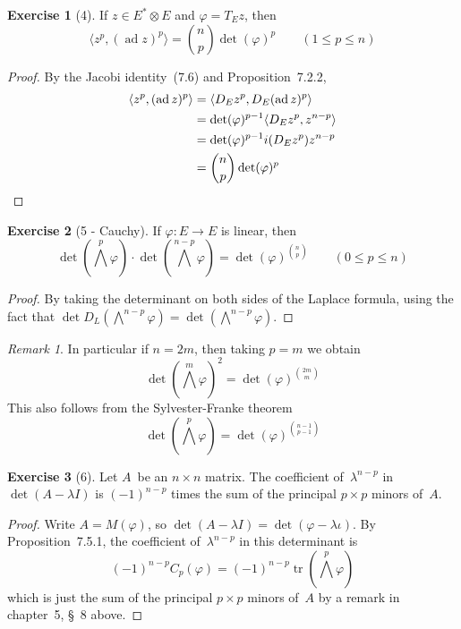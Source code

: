 \documentclass[letterpaper,12pt]{article}
\DeclareMathOperator{\ad}{ad}
\DeclareMathOperator{\tr}{tr}
\newcommand{\mult}{\cdot}
\newcommand{\tprod}{\otimes}
\newcommand{\bigeprod}{\bigwedge}
\newcommand{\medeprod}{{\textstyle\bigeprod}}
\newcommand{\sprod}[2]{\langle#1,#2\rangle}
\theoremstyle{definition}
\newtheorem*{exer}{Exercise}
\theoremstyle{remark}
\newtheorem*{rmk}{Remark}
\begin{document}
\begin{exer}[4]
If \(z\in E^*\tprod E\) and \(\varphi=T_Ez\), then
\[\sprod{z^p}{(\ad z)^p}=\binom{n}{p}\det(\varphi)^p\qquad(1\le p\le n)\]
\end{exer}
\begin{proof}
By the Jacobi identity~(7.6) and Proposition~7.2.2,
\begin{align*}
\sprod{z^p}{(\ad z)^p}&=\sprod{D_Ez^p}{D_E(\ad z)^p}\\
	&=\det(\varphi)^{p-1}\sprod{D_Ez^p}{z^{n-p}}\\
	&=\det(\varphi)^{p-1}i(D_Ez^p)z^{n-p}\\
	&=\binom{n}{p}\det(\varphi)^p\qedhere
\end{align*}
\end{proof}

\begin{exer}[5 - Cauchy]
If \(\varphi:E\to E\) is linear, then
\[\det(\medeprod^p\varphi)\mult\det(\medeprod^{n-p}\varphi)=\det(\varphi)^{\binom{n}{p}}\qquad(0\le p\le n)\]
\end{exer}
\begin{proof}
By taking the determinant on both sides of the Laplace formula, using the fact that \(\det D_L(\medeprod^{n-p}\varphi)=\det(\medeprod^{n-p}\varphi)\).
\end{proof}
\begin{rmk}
In particular if \(n=2m\), then taking \(p=m\) we obtain
\[\det(\medeprod^m\varphi)^2=\det(\varphi)^{\binom{2m}{m}}\]
This also follows from the Sylvester-Franke theorem
\[\det(\medeprod^p\varphi)=\det(\varphi)^{\binom{n-1}{p-1}}\]
\end{rmk}

\begin{exer}[6]
Let \(A\)~be an \(n\times n\) matrix. The coefficient of~\(\lambda^{n-p}\) in \(\det(A-\lambda I)\) is \((-1)^{n-p}\) times the sum of the principal \(p\times p\) minors of~\(A\).
\end{exer}
\begin{proof}
Write \(A=M(\varphi)\), so \(\det(A-\lambda I)=\det(\varphi-\lambda\iota)\). By Proposition~7.5.1, the coefficient of~\(\lambda^{n-p}\) in this determinant is
\[(-1)^{n-p}C_p(\varphi)=(-1)^{n-p}\tr(\medeprod^p\varphi)\]
which is just the sum of the principal \(p\times p\) minors of~\(A\) by a remark in chapter~5, \S~8 above.
\end{proof}
\end{document}
